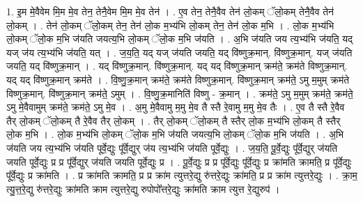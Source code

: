 \documentclass[17pt]{extarticle}
\begin{document}
1. इ॒म मे॒वैवेम मि॒म मे॒व तेन॒ तेनै॒वेम मि॒म मे॒व तेन॑ । . ए॒व तेन॒ तेनै॒वैव तेन॑ लो॒कम् ॅलो॒कम् तेनै॒वैव तेन॑ लो॒कम् । . तेन॑ लो॒कम् ॅलो॒कम् तेन॒ तेन॑ लो॒क म॒भ्य॑भि लो॒कम् तेन॒ तेन॑ लो॒क म॒भि । . लो॒क म॒भ्य॑भि लो॒कम् ॅलो॒क म॒भि ज॑यति जयत्य॒भि लो॒कम् ॅलो॒क म॒भि ज॑यति । . अ॒भि ज॑यति जय त्य॒भ्य॑भि ज॑यति॒ यद् यज् ज॑य त्य॒भ्य॑भि ज॑यति॒ यत् । . ज॒य॒ति॒ यद् यज् ज॑यति जयति॒ यद् वि॑ष्णुक्र॒मान्. वि॑ष्णुक्र॒मान्. यज् ज॑यति जयति॒ यद् वि॑ष्णुक्र॒मान् । . यद् वि॑ष्णुक्र॒मान्. वि॑ष्णुक्र॒मान्. यद् यद् वि॑ष्णुक्र॒मान् क्रम॑ते॒ क्रम॑ते विष्णुक्र॒मान्. यद् यद् वि॑ष्णुक्र॒मान् क्रम॑ते । . वि॒ष्णु॒क्र॒मान् क्रम॑ते॒ क्रम॑ते विष्णुक्र॒मान्. वि॑ष्णुक्र॒मान् क्रम॑ते॒ ऽमु म॒मुम् क्रम॑ते विष्णुक्र॒मान्. वि॑ष्णुक्र॒मान् क्रम॑ते॒ ऽमुम् । . वि॒ष्णु॒क्र॒मानिति॑ विष्णु - क्र॒मान् । . क्रम॑ते॒ ऽमु म॒मुम् क्रम॑ते॒ क्रम॑ते॒ ऽमु मे॒वैवामुम् क्रम॑ते॒ क्रम॑ते॒ ऽमु मे॒व । . अ॒मु मे॒वैवामु म॒मु मे॒व तै स्तै रे॒वामु म॒मु मे॒व तैः । . ए॒व तै स्तै रे॒वैव तैर् लो॒कम् ॅलो॒कम् तै रे॒वैव तैर् लो॒कम् । . तैर् लो॒कम् ॅलो॒कम् तै स्तैर् लो॒क म॒भ्य॑भि लो॒कम् तै स्तैर् लो॒क म॒भि । . लो॒क म॒भ्य॑भि लो॒कम् ॅलो॒क म॒भि ज॑यति जयत्य॒भि लो॒कम् ॅलो॒क म॒भि ज॑यति । . अ॒भि ज॑यति जय त्य॒भ्य॑भि ज॑यति पूर्वे॒द्युः पू᳚र्वे॒द्युर् ज॑य त्य॒भ्य॑भि ज॑यति पूर्वे॒द्युः । . ज॒य॒ति॒ पू॒र्वे॒द्युः पू᳚र्वे॒द्युर् ज॑यति जयति पूर्वे॒द्युः प्र प्र पू᳚र्वे॒द्युर् ज॑यति जयति पूर्वे॒द्युः प्र । . पू॒र्वे॒द्युः प्र प्र पू᳚र्वे॒द्युः पू᳚र्वे॒द्युः प्र क्रा॑मति क्रामति॒ प्र पू᳚र्वे॒द्युः पू᳚र्वे॒द्युः प्र क्रा॑मति । . प्र क्रा॑मति क्रामति॒ प्र प्र क्रा॑म त्युत्तरे॒द्यु रु॑त्तरे॒द्युः क्रा॑मति॒ प्र प्र क्रा॑म त्युत्तरे॒द्युः । . क्रा॒म॒ त्यु॒त्त॒रे॒द्यु रु॑त्तरे॒द्युः क्रा॑मति क्राम त्युत्तरे॒द्यु रुपोपो᳚त्तरे॒द्युः क्रा॑मति क्राम त्युत्त रे॒द्युरुप॑ । \newline
\end{document}

